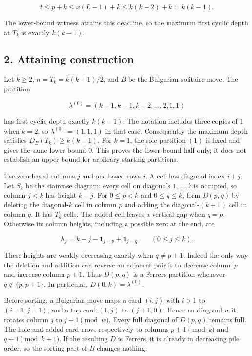 \documentclass[11pt,a4paper]{article}
\begin{document}
\[
t\le p+k\le x(L-1)+k\le k(k-2)+k=k(k-1).
\]

The lower-bound witness attains this deadline, so the maximum first cyclic depth at \(T_k\) is exactly \(k(k-1)\).

\subsection{2. Attaining construction}\label{attaining-construction}

Let \(k\ge2\), \(n=T_k=k(k+1)/2\), and \(B\) be the Bulgarian-solitaire move. The partition

\[
\lambda^{(0)}=(k-1,k-1,k-2,\ldots,2,1,1)
\]

has first cyclic depth exactly \(k(k-1)\). The notation includes three copies of \(1\) when \(k=2\), so \(\lambda^{(0)}=(1,1,1)\) in that case. Consequently the maximum depth satisfies \(D_B(T_k)\ge k(k-1)\). For \(k=1\), the sole partition \((1)\) is fixed and gives the same lower bound \(0\). This proves the lower-bound half only; it does not establish an upper bound for arbitrary starting partitions.

Use zero-based columns \(j\) and one-based rows \(i\). A cell has diagonal index \(i+j\). Let \(S_k\) be the staircase diagram: every cell on diagonals \(1,\ldots,k\) is occupied, so column \(j<k\) has height \(k-j\). For \(0\le p<k\) and \(0\le q\le k\), form \(D(p,q)\) by deleting the diagonal-\(k\) cell in column \(p\) and adding the diagonal-\((k+1)\) cell in column \(q\). It has \(T_k\) cells. The added cell leaves a vertical gap when \(q=p\). Otherwise its column heights, including a possible zero at the end, are

\[
h_j=k-j-\mathbf1_{j=p}+\mathbf1_{j=q}\qquad(0\le j\le k).
\]

These heights are weakly decreasing exactly when \(q\ne p+1\). Indeed the only way the deletion and addition can reverse an adjacent pair is to decrease column \(p\) and increase column \(p+1\). Thus \(D(p,q)\) is a Ferrers partition whenever \(q\notin\{p,p+1\}\). In particular, \(D(0,k)=\lambda^{(0)}\).

Before sorting, a Bulgarian move maps a card \((i,j)\) with \(i>1\) to \((i-1,j+1)\), and a top card \((1,j)\) to \((j+1,0)\). Hence on diagonal \(w\) it rotates column \(j\) to \(j+1\pmod w\). Every full diagonal of \(D(p,q)\) remains full. The hole and added card move respectively to columns \(p+1\pmod k\) and \(q+1\pmod{k+1}\). If the resulting \(D\) is Ferrers, it is already in decreasing pile order, so the sorting part of \(B\) changes nothing.
\end{document}

